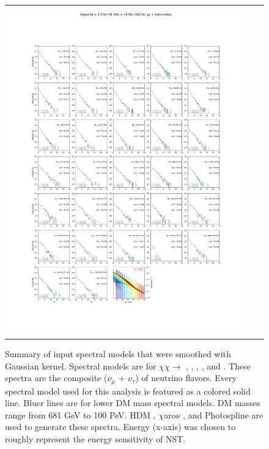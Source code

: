 \begin{figure}[t]
{\begin{tabular}{ccc}
            \includegraphics[clip, trim=22.1cm 6.5cm 19.5cm 56.5cm, scale=0.55]{figures/ic_DM/dm_plots/Segue1_nutaunutau_chi2_Masspanel_2024-03-23.pdf} \\
        \end{tabular}
    }\caption{Summary of input spectral models that were smoothed with Gaussian kernel. Spectral models are for $\chi\chi \rightarrow$ , \parpar{\mu}\parpar{\tau}, , \parpar{\nu_\mu}, and \parpar{\nu_\tau}. These spectra are the composite ($\nu_\mu$ + $\nu_\tau$) of neutrino flavors. Every spectral model used for this analysis is featured as a colored solid line. Bluer lines are for lower DM mass spectral models. DM masses range from 681 GeV to 100 PeV. HDM \cite{HDMSpectra}, $\chi$aro$\nu$ \cite{Charon}, and Photospline \cite{photospline} are used to generate these spectra. Energy (x-axis) was chosen to roughly represent the energy sensitivity of NST.}
    \label{fig:line_spectra_smooth}
\end{figure}

